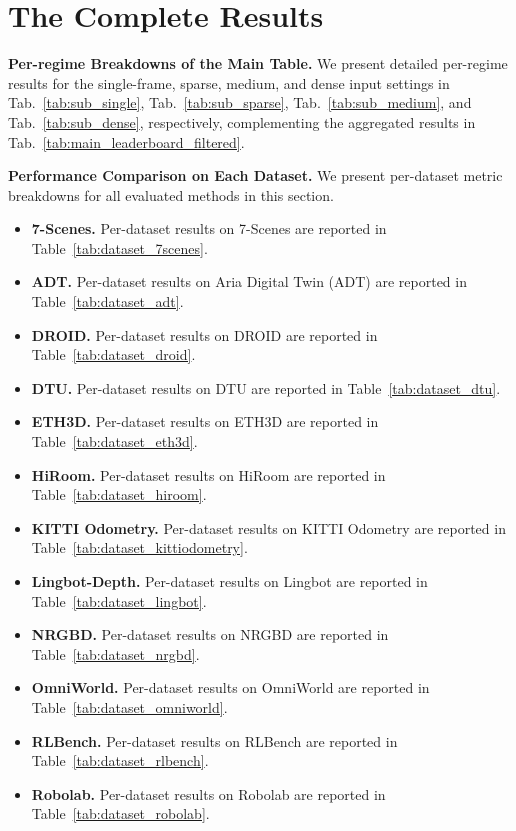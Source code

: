 \section{The Complete \benchmark Results}
\label{appendix:completeresults}

\textbf{Per-regime Breakdowns of the Main Table.} We present detailed per-regime results for the single-frame, sparse, medium, and dense input settings in Tab.~\ref{tab:sub_single}, Tab.~\ref{tab:sub_sparse}, Tab.~\ref{tab:sub_medium}, and Tab.~\ref{tab:sub_dense}, respectively, complementing the aggregated results in Tab.~\ref{tab:main_leaderboard_filtered}.

\noindent\textbf{Performance Comparison on Each Dataset.}
We present per-dataset metric breakdowns for all evaluated methods in this section.

\begin{itemize}
  \item \textbf{7-Scenes.} Per-dataset results on 7-Scenes are reported in Table~\ref{tab:dataset_7scenes}.
  \item \textbf{ADT.} Per-dataset results on Aria Digital Twin (ADT) are reported in Table~\ref{tab:dataset_adt}.
  \item \textbf{DROID.} Per-dataset results on DROID are reported in Table~\ref{tab:dataset_droid}.
  \item \textbf{DTU.} Per-dataset results on DTU are reported in Table~\ref{tab:dataset_dtu}.
  \item \textbf{ETH3D.} Per-dataset results on ETH3D are reported in Table~\ref{tab:dataset_eth3d}.
  \item \textbf{HiRoom.} Per-dataset results on HiRoom are reported in Table~\ref{tab:dataset_hiroom}.
  \item \textbf{KITTI Odometry.} Per-dataset results on KITTI Odometry are reported in Table~\ref{tab:dataset_kittiodometry}.
  \item \textbf{Lingbot-Depth.} Per-dataset results on Lingbot are reported in Table~\ref{tab:dataset_lingbot}.
  \item \textbf{NRGBD.} Per-dataset results on NRGBD are reported in Table~\ref{tab:dataset_nrgbd}.
  \item \textbf{OmniWorld.} Per-dataset results on OmniWorld are reported in Table~\ref{tab:dataset_omniworld}.
  \item \textbf{RLBench.} Per-dataset results on RLBench are reported in Table~\ref{tab:dataset_rlbench}.
  \item \textbf{Robolab.} Per-dataset results on Robolab are reported in Table~\ref{tab:dataset_robolab}.

\end{itemize}
